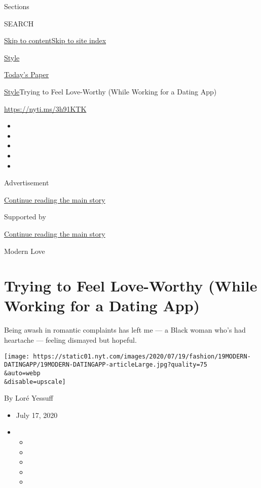 Sections

SEARCH

\protect\hyperlink{site-content}{Skip to
content}\protect\hyperlink{site-index}{Skip to site index}

\href{https://www.nytimes.com/section/style}{Style}

\href{https://myaccount.nytimes.com/auth/login?response_type=cookie\&client_id=vi}{}

\href{https://www.nytimes.com/section/todayspaper}{Today's Paper}

\href{/section/style}{Style}\textbar{}Trying to Feel Love-Worthy (While
Working for a Dating App)

\url{https://nyti.ms/3h91KTK}

\begin{itemize}
\item
\item
\item
\item
\item
\end{itemize}

Advertisement

\protect\hyperlink{after-top}{Continue reading the main story}

Supported by

\protect\hyperlink{after-sponsor}{Continue reading the main story}

Modern Love

\hypertarget{trying-to-feel-love-worthy-while-working-for-a-dating-app}{%
\section{Trying to Feel Love-Worthy (While Working for a Dating
App)}\label{trying-to-feel-love-worthy-while-working-for-a-dating-app}}

Being awash in romantic complaints has left me --- a Black woman who's
had heartache --- feeling dismayed but hopeful.

\texttt{[image: https://static01.nyt.com/images/2020/07/19/fashion/19MODERN-DATINGAPP/19MODERN-DATINGAPP-articleLarge.jpg?quality=75\\\&auto=webp\\\&disable=upscale]}

By Loré Yessuff

\begin{itemize}
\item
  July 17, 2020
\item
  \begin{itemize}
  \item
  \item
  \item
  \item
  \item
  \end{itemize}
\end{itemize}

